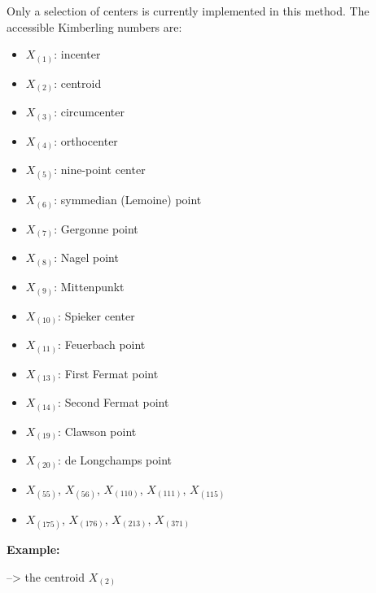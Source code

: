 \medskip
\noindent
Only a selection of centers is currently implemented in this method. The accessible Kimberling numbers are:
\begin{multicols}{2}
\begin{itemize}
  \item $X_{(1)}$: incenter
  \item $X_{(2)}$: centroid
  \item $X_{(3)}$: circumcenter
  \item $X_{(4)}$: orthocenter
  \item $X_{(5)}$: nine-point center
  \item $X_{(6)}$: symmedian (Lemoine) point
  \item $X_{(7)}$: Gergonne point
  \item $X_{(8)}$: Nagel point
  \item $X_{(9)}$: Mittenpunkt
  \item $X_{(10)}$: Spieker center
  \item $X_{(11)}$: Feuerbach point
  \item $X_{(13)}$: First Fermat point
  \item $X_{(14)}$: Second Fermat point
  \item $X_{(19)}$: Clawson point
  \item $X_{(20)}$: de Longchamps point
  \item $X_{(55)}$, $X_{(56)}$, $X_{(110)}$, $X_{(111)}$, $X_{(115)}$
  \item $X_{(175)}$, $X_{(176)}$, $X_{(213)}$, $X_{(371)}$
\end{itemize}
\end{multicols}

\noindent
\textbf{Example:}
\begin{mybox}
 \quad --> the centroid $X_{(2)}$
\end{mybox}

\vspace{1em}

\begin{tkzexample}[latex=.5\textwidth]
\begin{center}
\end{center}
\end{tkzexample}


